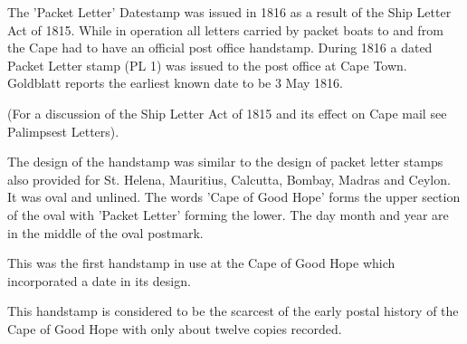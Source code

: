 The 'Packet Letter' Datestamp was issued  in 1816 as a result of the 
Ship Letter Act of 1815. While in operation all letters carried by 
packet boats to and from the Cape had to have an official post 
office handstamp. During 1816 a dated Packet Letter stamp (PL 1) 
was issued to the post office at Cape Town. Goldblatt reports 
the earliest known date to be 3 May 1816.

(For a discussion of the Ship Letter Act of 1815 and its effect on 
Cape mail see Palimpsest Letters).

The design of the handstamp was similar to the design of packet 
letter stamps also provided for St. Helena, Mauritius, Calcutta, 
Bombay, Madras and Ceylon. It was oval and unlined. The words 
'Cape of Good Hope' forms the upper section of the oval with 
'Packet Letter' forming the lower. The day month and year are 
in the middle of the oval postmark.

This was the first handstamp in use at the Cape of Good Hope 
which incorporated a date in its design.

This handstamp is considered to be the scarcest of the early 
postal history of the Cape of Good Hope with only about twelve copies recorded.



	 
                                              